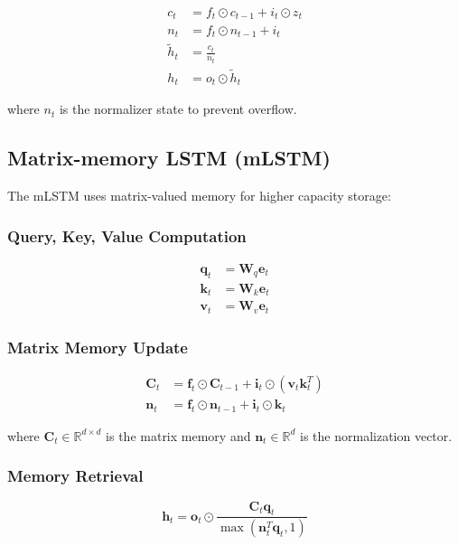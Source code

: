 \documentclass[11pt,a4paper]{article}
\begin{document}
\begin{align}
c_t &= f_t \odot c_{t-1} + i_t \odot z_t \\
n_t &= f_t \odot n_{t-1} + i_t \\
\tilde{h}_t &= \frac{c_t}{n_t} \\
h_t &= o_t \odot \tilde{h}_t
\end{align}

where $n_t$ is the normalizer state to prevent overflow.

\subsection{Matrix-memory LSTM (mLSTM)}

The mLSTM uses matrix-valued memory for higher capacity storage:

\subsubsection{Query, Key, Value Computation}

\begin{align}
\mathbf{q}_t &= \mathbf{W}_q \mathbf{e}_t \\
\mathbf{k}_t &= \mathbf{W}_k \mathbf{e}_t \\
\mathbf{v}_t &= \mathbf{W}_v \mathbf{e}_t
\end{align}

\subsubsection{Matrix Memory Update}

\begin{align}
\mathbf{C}_t &= \mathbf{f}_t \odot \mathbf{C}_{t-1} + \mathbf{i}_t \odot (\mathbf{v}_t \mathbf{k}_t^T) \\
\mathbf{n}_t &= \mathbf{f}_t \odot \mathbf{n}_{t-1} + \mathbf{i}_t \odot \mathbf{k}_t
\end{align}

where $\mathbf{C}_t \in \mathbb{R}^{d \times d}$ is the matrix memory and $\mathbf{n}_t \in \mathbb{R}^d$ is the normalization vector.

\subsubsection{Memory Retrieval}

\begin{equation}
\mathbf{h}_t = \mathbf{o}_t \odot \frac{\mathbf{C}_t \mathbf{q}_t}{\max(\mathbf{n}_t^T \mathbf{q}_t, 1)}
\end{equation}
\end{document}
